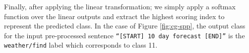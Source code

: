 Finally, after applying the linear transformation; we simply apply a softmax
function over the linear outputs and extract the highest scoring index to
represent the predicted class. In the case of Figure \ref{fig:cg-spp}, the
output class for the input pre-processed sentence \texttt{``[START] 10 day
  forecast [END]''} is the \texttt{weather/find} label which corresponds to class 11.

